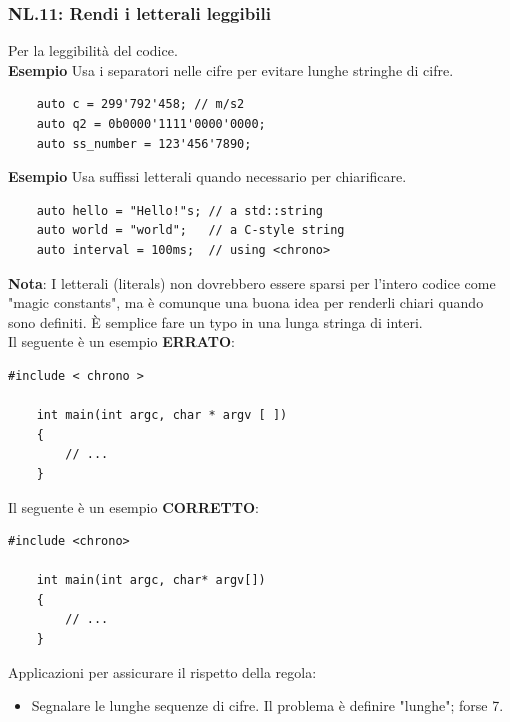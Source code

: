 \subsubsection{NL.11: Rendi i letterali leggibili}

\textsf{\small Per la leggibilità del codice.} \\

\textsf{\small \textbf{Esempio} Usa i separatori nelle cifre per evitare lunghe stringhe di cifre.}

\begin{lstlisting}
	auto c = 299'792'458; // m/s2
	auto q2 = 0b0000'1111'0000'0000;
	auto ss_number = 123'456'7890;
\end{lstlisting}

\textsf{\small \textbf{Esempio} Usa suffissi letterali quando necessario per chiarificare.}

\begin{lstlisting}
	auto hello = "Hello!"s; // a std::string
	auto world = "world";   // a C-style string
	auto interval = 100ms;  // using <chrono>
\end{lstlisting}

\textsf{\small \textbf{Nota}: I letterali (literals) non dovrebbero essere sparsi per l'intero codice come "magic constants", ma è comunque una buona idea per renderli chiari quando sono definiti. È semplice fare un typo in una lunga stringa di interi.} \\

\textsf{\small Il seguente è un esempio \textbf{\color{red}ERRATO}\normalcolor:}

\begin{lstlisting}[frame=single, rulecolor=\color{red}]
	#include < chrono >
	
	int main(int argc, char * argv [ ])
	{
		// ...
	}
\end{lstlisting}

\textsf{\small Il seguente è un esempio \textbf{\color{ForestGreen}CORRETTO}\normalcolor:}

\begin{lstlisting}[frame=single, rulecolor=\color{ForestGreen}]
	#include <chrono>
	
	int main(int argc, char* argv[])
	{
		// ...
	}
\end{lstlisting}

\textsf{\small Applicazioni per assicurare il rispetto della regola: }

\begin{itemize}
	\item \textsf{\small Segnalare le lunghe sequenze di cifre. Il problema è definire "lunghe"; forse 7.}
\end{itemize}

